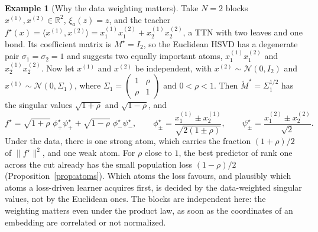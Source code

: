 \documentclass[11pt]{article}
\newcommand{\R}{\mathbb{R}}
\newcommand{\norm}[1]{\lVert #1\rVert}
\theoremstyle{definition}
\newtheorem{example}[theorem]{Example}
\numberwithin{equation}{section}
\begin{document}
\begin{example}[Why the data weighting matters]\label{ex:dw}
Take $N=2$ blocks $x^{(1)},x^{(2)}\in\R^2$, $\xi_a(z)=z$, and the teacher $f^\star(x)=\langle x^{(1)},x^{(2)}\rangle=x^{(1)}_1x^{(2)}_1+x^{(1)}_2x^{(2)}_2$, a TTN with two leaves and one bond. Its coefficient matrix is $M^\star=I_2$, so the Euclidean HSVD has a degenerate pair $\sigma_1=\sigma_2=1$ and suggests two equally important atoms, $x^{(1)}_1x^{(2)}_1$ and $x^{(1)}_2x^{(2)}_2$. Now let $x^{(1)}$ and $x^{(2)}$ be independent, with $x^{(2)}\sim\mathcal N(0,I_2)$ and $x^{(1)}\sim\mathcal N(0,\Sigma_1)$, where $\Sigma_1=\left(\begin{smallmatrix}1&\rho\\\rho&1\end{smallmatrix}\right)$ and $0<\rho<1$. Then $\tilde M^\star=\Sigma_1^{1/2}$ has the singular values $\sqrt{1+\rho}$ and $\sqrt{1-\rho}$, and
\[
f^\star=\sqrt{1+\rho}\;\phi^\star_+\psi^\star_++\sqrt{1-\rho}\;\phi^\star_-\psi^\star_-,\qquad
\phi^\star_\pm=\frac{x^{(1)}_1\pm x^{(1)}_2}{\sqrt{2(1\pm\rho)}},\qquad
\psi^\star_\pm=\frac{x^{(2)}_1\pm x^{(2)}_2}{\sqrt2}.
\]
Under the data, there is one strong atom, which carries the fraction $(1+\rho)/2$ of $\norm{f^\star}^2$, and one weak atom. For $\rho$ close to $1$, the best predictor of rank one across the cut already has the small population loss $(1-\rho)/2$ (Proposition~\ref{prop:atoms}). Which atoms the loss favours, and plausibly which atoms a loss-driven learner acquires first, is decided by the data-weighted singular values, not by the Euclidean ones. The blocks are independent here: the weighting matters even under the product law, as soon as the coordinates of an embedding are correlated or not normalized.
\end{example}
\end{document}
